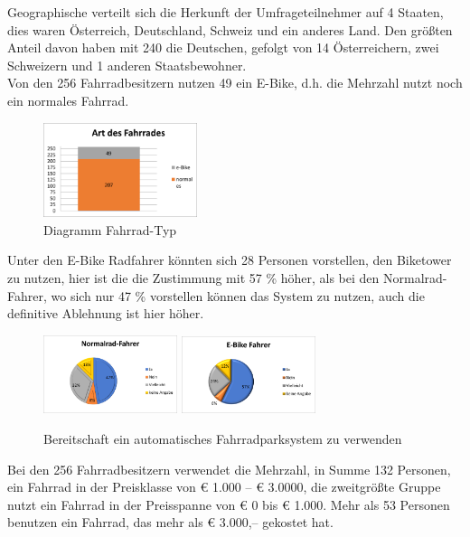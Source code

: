 Geographische verteilt sich die Herkunft der Umfrageteilnehmer auf 4 Staaten, dies waren Österreich, Deutschland, Schweiz und ein anderes Land. Den größten Anteil davon haben mit 240 die Deutschen, gefolgt von 14 Österreichern, zwei Schweizern und 1 anderen Staatsbewohner.\\
Von den 256 Fahrradbesitzern nutzen 49 ein E-Bike, d.h. die Mehrzahl nutzt noch ein normales Fahrrad.\\
\begin{figure}[H]
    \centering
    \includegraphics[width=0.4\textwidth]{images/artdesfahrrades.png}
    \caption{Diagramm Fahrrad-Typ}
    \label{fig:diagrammfahrradtyp}
\end{figure}
Unter den E-Bike Radfahrer könnten sich 28 Personen vorstellen, den Biketower zu nutzen, hier ist die die Zustimmung mit 57 \% höher, als bei den Normalrad-Fahrer, wo sich nur 47 \% vorstellen können das System zu nutzen, auch die definitive Ablehnung ist hier höher.\\
\begin{figure}[H]
    \centering
    \includegraphics[width=0.35\textwidth]{images/normalradfahrer.png}
    \includegraphics[width=0.35\textwidth]{images/ebikefahrer.png}
    \caption{Bereitschaft ein automatisches Fahrradparksystem zu verwenden}
    \label{fig:bereitschaftnutzung}
\end{figure}
Bei den 256 Fahrradbesitzern verwendet die Mehrzahl, in Summe 132 Personen, ein Fahrrad in der Preisklasse von € 1.000 – € 3.0000, die zweitgrößte Gruppe nutzt ein Fahrrad in der Preisspanne von € 0 bis € 1.000. Mehr als 53 Personen benutzen ein Fahrrad, das mehr als € 3.000,-- gekostet hat.\\
